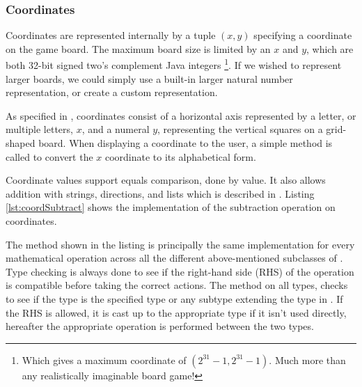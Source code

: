 \subsubsection{Coordinates}
Coordinates are represented internally by a tuple $(x, y)$ specifying a
coordinate on the game board. The maximum board size is limited by an $x$ and
$y$, which are both 32-bit signed two's complement Java integers \footnote{ Which gives a maximum coordinate of $(2^{31} - 1, 2^{31} - 1)$.
Much more than any realistically imaginable board game!}.
If we wished to represent larger boards, we could simply use a built-in larger
natural number representation, or create a custom representation.

As specified in , coordinates consist of
a horizontal axis represented by a letter, or multiple letters, $x$, and a
numeral $y$, representing the vertical squares on a grid-shaped board.
When displaying a coordinate to the user, a simple method is called to
convert the $x$ coordinate to its alphabetical form.

Coordinate values support equals comparison, done by value. It also allows
addition with strings, directions, and lists which is described in
. Listing \ref{lst:coordSubtract} shows the
implementation of the subtraction operation on coordinates.



The method shown in the listing is principally the same implementation for every
mathematical operation across all the different above-mentioned subclasses of
. Type checking is always done to see if the right-hand side
(RHS) of
the operation is compatible before taking the correct actions. The method
 on all  types, checks to see if the type is the
specified type or any subtype extending the type in \productname{}. If the RHS
is allowed, it is cast up to the appropriate type if it isn't used directly,
hereafter the appropriate operation is performed between the two types.

%

